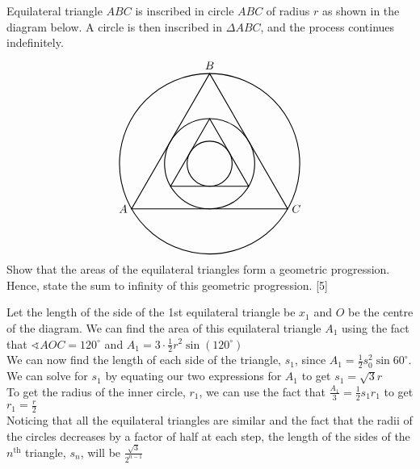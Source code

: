 \documentclass[12pt, a4 paper]{article}
\begin{document}
\begin{outline}[enumerate]
 \1 Equilateral triangle \(ABC\) is inscribed in circle \(ABC\) of radius \(r\) as shown in the diagram below. A circle is then inscribed in \(\Delta ABC\), and the process continues indefinitely. %
 \[
  \begin{tikzpicture}
   \draw[thick] (0,0) circle (80pt);
   \draw[thick] (0,80pt) node[above]{\(B\)} -- (69.282pt,-40pt) node[right]{\(C\)} -- (-69.282pt,-40pt) node[left]{\(A\)} -- cycle;
   \draw[thick] (0,0) circle (40pt);
   \draw[thick] (0,40pt) -- (34.641pt,-20pt) -- (-34.641pt,-20pt) -- cycle;
   \draw[thick] (0,0) circle (20pt);
  \end{tikzpicture}
 \]
 \2 Show that the areas of the equilateral triangles form a geometric progression. Hence, state the sum to infinity of this geometric progression. \hfill[5]
\begin{answer}
  Let the length of the side of the 1st equilateral triangle be \(x_1\) and \(O\) be the centre of the diagram. We can find the area of this equilateral triangle \(A_1\) using the fact that \(\sphericalangle AOC = 120^{\circ}\) and \(A_1 = 3\cdot\frac{1}{2}r^2\sin(120^\circ)\) \\

  We can now find the length of each side of the triangle, \(s_1\), since \(A_1 = \frac{1}{2}s_0^2\sin60^\circ \). We can solve for \(s_1\) by equating our two expressions for \(A_1\) to get \(s_1 = \sqrt3r\) \\

  To get the radius of the inner circle, \(r_1\), we can use the fact that \(\frac{A_1}{3} = \frac{1}{2}s_1r_1\) to get \(r_1 = \frac{r}{2}\) \\

  Noticing that all the equilateral triangles are similar and the fact that the radii of the circles decreases by a factor of half at each step, the length of the sides of the \(n^{\textrm{th}}\) triangle, \(s_n\), will be \(\frac{\sqrt3}{2^{n-1}}\) \\


\end{answer}
\end{outline}
\end{document}
